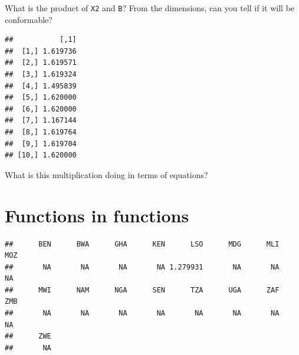 \documentclass[]{book}
\newenvironment{Shaded}{\begin{snugshade}}{\end{snugshade}}
\newcommand{\KeywordTok}[1]{\textcolor[rgb]{0.13,0.29,0.53}{\textbf{#1}}}
\newcommand{\DataTypeTok}[1]{\textcolor[rgb]{0.13,0.29,0.53}{#1}}
\newcommand{\StringTok}[1]{\textcolor[rgb]{0.31,0.60,0.02}{#1}}
\newcommand{\OtherTok}[1]{\textcolor[rgb]{0.56,0.35,0.01}{#1}}
\newcommand{\ControlFlowTok}[1]{\textcolor[rgb]{0.13,0.29,0.53}{\textbf{#1}}}
\newcommand{\OperatorTok}[1]{\textcolor[rgb]{0.81,0.36,0.00}{\textbf{#1}}}
\newcommand{\NormalTok}[1]{#1}
\theoremstyle{definition}
\theoremstyle{definition}
\theoremstyle{definition}
\theoremstyle{remark}
\begin{document}
What is the product of \texttt{X2} and \texttt{B}? From the dimensions,
can you tell if it will be conformable?

\begin{Shaded}
\end{Shaded}

\begin{verbatim}
##           [,1]
##  [1,] 1.619736
##  [2,] 1.619571
##  [3,] 1.619324
##  [4,] 1.495839
##  [5,] 1.620000
##  [6,] 1.620000
##  [7,] 1.167144
##  [8,] 1.619764
##  [9,] 1.619704
## [10,] 1.620000
\end{verbatim}

What is this multiplication doing in terms of equations?

\section{Functions in functions}\label{functions-in-functions}

\begin{Shaded}
\end{Shaded}

\begin{verbatim}
##      BEN      BWA      GHA      KEN      LSO      MDG      MLI      MOZ 
##       NA       NA       NA       NA 1.279931       NA       NA       NA 
##      MWI      NAM      NGA      SEN      TZA      UGA      ZAF      ZMB 
##       NA       NA       NA       NA       NA       NA       NA       NA 
##      ZWE 
##       NA
\end{verbatim}

\begin{Shaded}
\end{Shaded}
\end{document}

